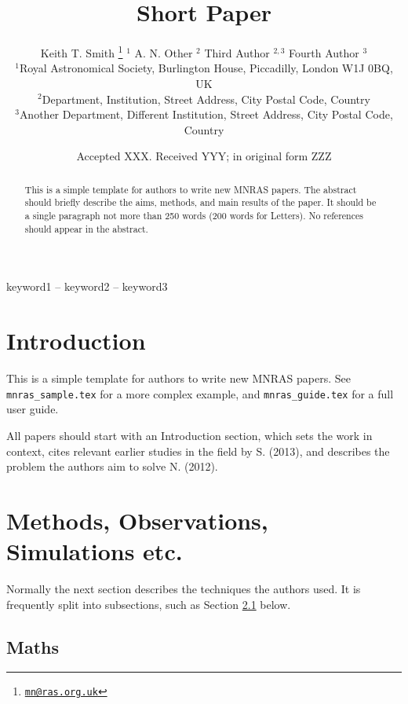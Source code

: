 \documentclass[a4paper,fleqn,usenatbib]{mnras}
\title[Short Paper]{Short Paper}
\author[K. T. Smith et al.]{
	Keith T. Smith
			\thanks{\href{mailto:mn@ras.org.uk}{\nolinkurl{mn@ras.org.uk}}}
				$^{1}$
		A. N. Other
				$^{2}$
		Third Author
				$^{2,3}$
		Fourth Author
				$^{3}$
	\\
			$^{1}$Royal Astronomical Society, Burlington House, Piccadilly,
London W1J 0BQ, UK\\
			$^{2}$Department, Institution, Street Address, City Postal Code,
Country\\
			$^{3}$Another Department, Different Institution, Street Address, City
Postal Code, Country}
\date{Accepted XXX. Received YYY; in original form ZZZ}
\begin{document}
\label{firstpage}
\pagerange{\pageref{firstpage}--\pageref{lastpage}}


\maketitle

\begin{abstract}
This is a simple template for authors to write new MNRAS papers. The
abstract should briefly describe the aims, methods, and main results of
the paper. It should be a single paragraph not more than 250 words (200
words for Letters). No references should appear in the abstract.
\end{abstract}

\begin{keywords}
keyword1 -- keyword2 -- keyword3
\end{keywords}



\hypertarget{introduction}{%
\section{Introduction}\label{introduction}}

This is a simple template for authors to write new MNRAS papers. See
\texttt{mnras\_sample.tex} for a more complex example, and
\texttt{mnras\_guide.tex} for a full user guide.

All papers should start with an Introduction section, which sets the
work in context, cites relevant earlier studies in the field by S.
(2013), and describes the problem the authors aim to solve N. (2012).

\hypertarget{methods-observations-simulations-etc.}{%
\section{Methods, Observations, Simulations
etc.}\label{methods-observations-simulations-etc.}}

Normally the next section describes the techniques the authors used. It
is frequently split into subsections, such as Section \ref{maths} below.

\hypertarget{maths}{%
\subsection{Maths}\label{maths}}
\end{document}
